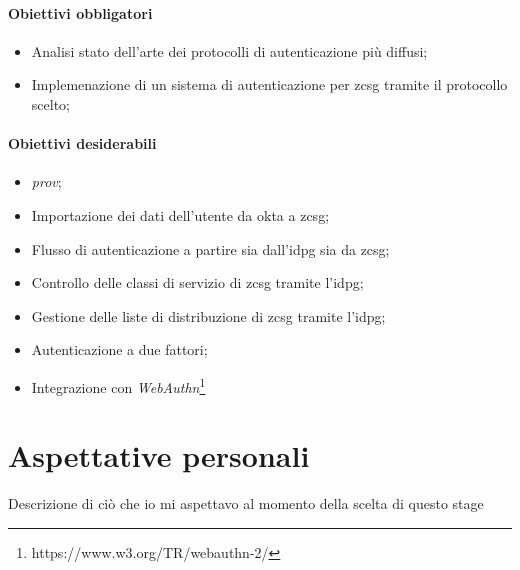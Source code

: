 \paragraph{Obiettivi obbligatori}
\begin{itemize}
    \item Analisi stato dell'arte dei protocolli di autenticazione più diffusi;
    \item Implemenazione di un sistema di autenticazione per \gls{zcsg} tramite il protocollo scelto;
\end{itemize}
\paragraph{Obiettivi desiderabili}
\begin{itemize}
    \item \textit{\gls{prov}};
    \item Importazione dei dati dell'utente da \gls{okta} a \gls{zcsg};
    \item Flusso di autenticazione a partire sia dall'\gls{idpg} sia da \gls{zcsg};
    \item Controllo delle classi di servizio di \gls{zcsg} tramite l'\gls{idpg};
    \item Gestione delle liste di distribuzione di \gls{zcsg} tramite l'\gls{idpg};
    \item Autenticazione a due fattori;
    \item Integrazione con \textit{WebAuthn}\footnote{https://www.w3.org/TR/webauthn-2/}
\end{itemize}

\section{Aspettative personali}
Descrizione di ciò che io mi aspettavo al momento della scelta di questo stage

